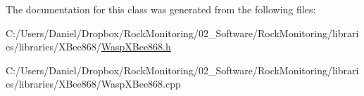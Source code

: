 The documentation for this class was generated from the following files\+:\begin{DoxyCompactItemize}
\item 
C\+:/\+Users/\+Daniel/\+Dropbox/\+Rock\+Monitoring/02\+\_\+\+Software/\+Rock\+Monitoring/libraries/libraries/\+X\+Bee868/\hyperlink{_wasp_x_bee868_8h}{Wasp\+X\+Bee868.\+h}\item 
C\+:/\+Users/\+Daniel/\+Dropbox/\+Rock\+Monitoring/02\+\_\+\+Software/\+Rock\+Monitoring/libraries/libraries/\+X\+Bee868/Wasp\+X\+Bee868.\+cpp\end{DoxyCompactItemize}
